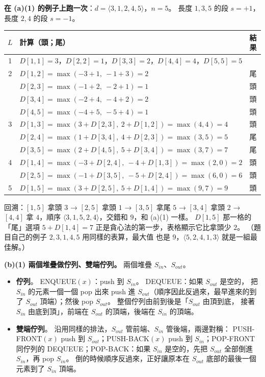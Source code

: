 \begin{pastsoln}
\textbf{在 (a)(1) 的例子上跑一次}：$d = \langle 3, 1, 2, 4, 5\rangle$，$n = 5$。 長度 $1, 3, 5$ 的段
$s = +1$，長度 $2, 4$ 的段 $s = -1$。
\begin{center}
\small
\begin{tabular}{cll}
\toprule
$L$ & 計算（頭；尾） & 結果 \\
\midrule
1 & $D[1,1] = 3$，$D[2,2] = 1$，$D[3,3] = 2$，$D[4,4] = 4$，$D[5,5] = 5$ & \\
2 & $D[1,2] = \max(-3 + 1,\ -1 + 3) = 2$ & 尾 \\
 & $D[2,3] = \max(-1 + 2,\ -2 + 1) = 1$ & 頭 \\
 & $D[3,4] = \max(-2 + 4,\ -4 + 2) = 2$ & 頭 \\
 & $D[4,5] = \max(-4 + 5,\ -5 + 4) = 1$ & 頭 \\
3 & $D[1,3] = \max(3 + D[2,3],\ 2 + D[1,2]) = \max(4, 4) = 4$ & 頭 \\
 & $D[2,4] = \max(1 + D[3,4],\ 4 + D[2,3]) = \max(3, 5) = 5$ & 尾 \\
 & $D[3,5] = \max(2 + D[4,5],\ 5 + D[3,4]) = \max(3, 7) = 7$ & 尾 \\
4 & $D[1,4] = \max(-3 + D[2,4],\ -4 + D[1,3]) = \max(2, 0) = 2$ & 頭 \\
 & $D[2,5] = \max(-1 + D[3,5],\ -5 + D[2,4]) = \max(6, 0) = 6$ & 頭 \\
5 & $D[1,5] = \max(3 + D[2,5],\ 5 + D[1,4]) = \max(9, 7) = 9$ & 頭 \\
\bottomrule
\end{tabular}
\end{center}
回溯：$[1,5]$ 拿頭 $3$ → $[2,5]$ 拿頭 $1$ → $[3,5]$ 拿尾 $5$ → $[3,4]$ 拿頭 $2$ → $[4,4]$ 拿 $4$，順序
$\langle 3, 1, 5, 2, 4\rangle$，交錯和 $9$，和 (a)(1) 一樣。 $D[1,5]$ 那一格的「尾」選項 $5 + D[1,4] = 7$
正是貪心法的第一步，表格顯示它比拿頭少 $2$。 （題目自己的例子 $2, 3, 1, 4, 5$ 用同樣的表算，最大值
也是 $9$，$\langle 5, 2, 4, 1, 3\rangle$ 就是一組最佳解。）

\textbf{(b)(1) 兩個堆疊做佇列、雙端佇列。} 兩個堆疊 $S_{\mathit{in}}$、$S_{\mathit{out}}$。
\begin{itemize}
\item \textbf{佇列}。 ENQUEUE$(x)$：push 到 $S_{\mathit{in}}$。 DEQUEUE：如果 $S_{\mathit{out}}$ 是空的，
把 $S_{\mathit{in}}$ 的元素一個一個 pop 出來 push 進 $S_{\mathit{out}}$（順序因此反過來，最早進來的到了
$S_{\mathit{out}}$ 頂端）；然後 pop $S_{\mathit{out}}$。 整個佇列由前到後是「$S_{\mathit{out}}$ 由頂到底，
接著 $S_{\mathit{in}}$ 由底到頂」，前端在 $S_{\mathit{out}}$ 的頂端，後端在 $S_{\mathit{in}}$ 的頂端。
\item \textbf{雙端佇列}。 沿用同樣的排法，$S_{\mathit{out}}$ 管前端、$S_{\mathit{in}}$ 管後端，兩邊對稱：
PUSH-FRONT$(x)$ push 到 $S_{\mathit{out}}$；PUSH-BACK$(x)$ push 到 $S_{\mathit{in}}$；POP-FRONT 同佇列的
DEQUEUE；POP-BACK：如果 $S_{\mathit{in}}$ 是空的，先把 $S_{\mathit{out}}$ 全部倒進 $S_{\mathit{in}}$，再 pop
$S_{\mathit{in}}$。 倒的時候順序反過來，正好讓原本在 $S_{\mathit{out}}$ 底部的最後一個元素到了
$S_{\mathit{in}}$ 頂端。
\end{itemize}


\end{pastsoln}

